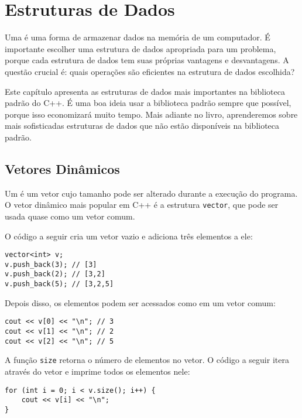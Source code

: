 \chapter{Estruturas de Dados}


Uma  é uma forma de armazenar
dados na memória de um computador.
É importante escolher uma estrutura de dados apropriada para um problema,
porque cada estrutura de dados tem suas próprias
vantagens e desvantagens.
A questão crucial é: quais operações
são eficientes na estrutura de dados escolhida?

Este capítulo apresenta as estruturas de dados mais importantes
na biblioteca padrão do C++.
É uma boa ideia usar a biblioteca padrão
sempre que possível,
porque isso economizará muito tempo.
Mais adiante no livro, aprenderemos sobre mais sofisticadas
estruturas de dados que não estão disponíveis
na biblioteca padrão.

\section{Vetores Dinâmicos}


Um  é um vetor cujo
tamanho pode ser alterado durante a execução
do programa.
O vetor dinâmico mais popular em C++ é
a estrutura \texttt{vector},
que pode ser usada quase como um vetor comum.

O código a seguir cria um vetor vazio e
adiciona três elementos a ele:

\begin{lstlisting}
vector<int> v;
v.push_back(3); // [3]
v.push_back(2); // [3,2]
v.push_back(5); // [3,2,5]
\end{lstlisting}

Depois disso, os elementos podem ser acessados como em um vetor comum:

\begin{lstlisting}
cout << v[0] << "\n"; // 3
cout << v[1] << "\n"; // 2
cout << v[2] << "\n"; // 5
\end{lstlisting}

A função \texttt{size} retorna o número de elementos no vetor.
O código a seguir itera através
do vetor e imprime todos os elementos nele:

\begin{lstlisting}
for (int i = 0; i < v.size(); i++) {
    cout << v[i] << "\n";
}
\end{lstlisting}

